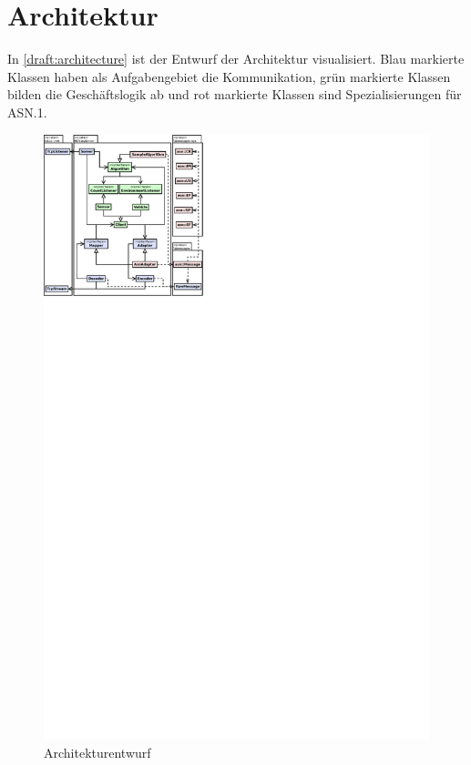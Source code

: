 

\section{Architektur}
		
In \autoref{draft:architecture} ist der Entwurf der Architektur visualisiert.
Blau markierte Klassen haben als Aufgabengebiet die Kommunikation, grün markierte Klassen bilden die Geschäftslogik ab und rot markierte Klassen sind Spezialisierungen für ASN.1.


\begin{figure}[H]
	\centering
	\includegraphics[width=2.0\textwidth]{dia/architecture}
	\caption{Architekturentwurf}
	\label{draft:architecture}
\end{figure}


